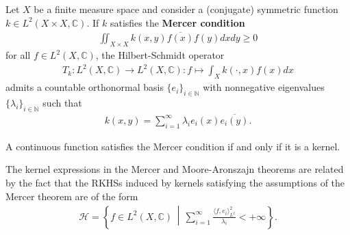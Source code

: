     \begin{theorem}[Mercer]
        Let $X$ be a finite measure space and consider a (conjugate) symmetric function $k\in L^2(X\times X,\mathbb{C})$. If $k$ satisfies the \textbf{Mercer condition}
        \begin{gather}
            \iint_{X\times X}k(x,y)\overline{f(x)}f(y)dxdy\geq0
        \end{gather}
        for all $f\in L^2(X,\mathbb{C})$, the Hilbert-Schmidt operator
        \begin{gather}
            T_k:L^2(X,\mathbb{C})\rightarrow L^2(X,\mathbb{C}):f\mapsto\int_Xk(\cdot,x)f(x)dx
        \end{gather}
        admits a countable orthonormal basis $\{e_i\}_{i\in\mathbb{N}}$ with nonnegative eigenvalues $\{\lambda_i\}_{i\in\mathbb{N}}$ such that
        \begin{gather}
            k(x,y) = \sum_{i=1}^\infty\lambda_ie_i(x)\overline{e_i(y)}.
        \end{gather}
    \end{theorem}
    \begin{theorem}[Bochner]
        A continuous function satisfies the Mercer condition if and only if it is a kernel.
    \end{theorem}


    \begin{remark}
        The kernel expressions in the Mercer and Moore-Aronszajn theorems are related by the fact that the RKHSs induced by kernels satisfying the assumptions of the Mercer theorem are of the form
        \begin{gather}
            \mathcal{H} = \left\{f\in L^2(X,\mathbb{C})\,\middle\vert\,\sum_{i=1}^\infty\frac{\langle f,e_i \rangle^2_{L^2}}{\lambda_i}<+\infty\right\}.
        \end{gather}
    \end{remark}

